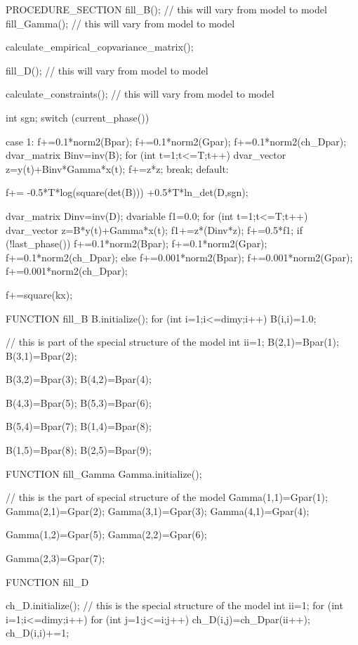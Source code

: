 \beginexample
PROCEDURE_SECTION
  fill_B();    // this will vary from model to model
  fill_Gamma();  // this will vary from model to model

  calculate_empirical_copvariance_matrix();

  fill_D();  // this will vary from model to model

  calculate_constraints();  // this will vary from model to model

  int sgn;
  switch (current_phase())
  {
  case 1:
    {
      f+=0.1*norm2(Bpar);
      f+=0.1*norm2(Gpar);
      f+=0.1*norm2(ch_Dpar);
      dvar_matrix Binv=inv(B);
      for (int t=1;t<=T;t++)
      {
        dvar_vector z=y(t)+Binv*Gamma*x(t);
        f+=z*z;
      }
      break;
    }
  default: 
    {
      f+= -0.5*T*log(square(det(B)))
       +0.5*T*ln_det(D,sgn);
  
      dvar_matrix Dinv=inv(D);
      dvariable f1=0.0;
      for (int t=1;t<=T;t++)
      {
        dvar_vector z=B*y(t)+Gamma*x(t);
        f1+=z*(Dinv*z);
      }
      f+=0.5*f1;
      if (!last_phase())
      {
        f+=0.1*norm2(Bpar);
        f+=0.1*norm2(Gpar);
        f+=0.1*norm2(ch_Dpar);
      }
      else
      {
        f+=0.001*norm2(Bpar);
        f+=0.001*norm2(Gpar);
        f+=0.001*norm2(ch_Dpar);
      }
    }
  }
  
  f+=square(kx);

FUNCTION fill_B
  B.initialize();
  for (int i=1;i<=dimy;i++)
    B(i,i)=1.0;

  // this is part of the special structure of the model
  int ii=1;
  B(2,1)=Bpar(1);
  B(3,1)=Bpar(2);

  B(3,2)=Bpar(3);
  B(4,2)=Bpar(4);

  B(4,3)=Bpar(5);
  B(5,3)=Bpar(6);

  B(5,4)=Bpar(7);
  B(1,4)=Bpar(8);

  B(1,5)=Bpar(8);
  B(2,5)=Bpar(9);


FUNCTION fill_Gamma
  Gamma.initialize();

  // this is the part of special structure of the model
  Gamma(1,1)=Gpar(1);
  Gamma(2,1)=Gpar(2);
  Gamma(3,1)=Gpar(3);
  Gamma(4,1)=Gpar(4);

  Gamma(1,2)=Gpar(5);  
  Gamma(2,2)=Gpar(6);  


  Gamma(2,3)=Gpar(7);  


FUNCTION fill_D

  ch_D.initialize();
  // this is the special structure of the model
  int ii=1;
  for (int i=1;i<=dimy;i++)
  {
    for (int j=1;j<=i;j++)
      ch_D(i,j)=ch_Dpar(ii++);
    ch_D(i,i)+=1;
  }

